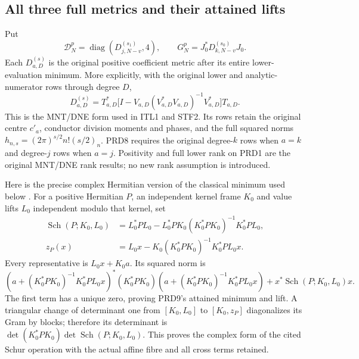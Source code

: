 \documentclass[11pt,a4paper]{article}
\begin{document}
\subsection{All three full metrics and their attained lifts}
Put
\[
 \mathcal D_N^p=\operatorname{diag}(D_{j,N-v}^{(s_1)},4),
 \qquad G_N^p=J_0^*D_{k,N-v}^{(s_0)}J_0.                  \tag{PRD7}
\]
Each $D_{a,D}^{(s)}$ is the original positive coefficient metric
after its entire lower-evaluation minimum. More explicitly, with
the original lower and analytic-numerator rows through degree $D$,
\[
 D_{a,D}^{(s)}=T_{a,D}^*
 \bigl[I-V_{a,D}(V_{a,D}^*V_{a,D})^{-1}V_{a,D}^*\bigr]T_{a,D}.
                                                               \tag{PRD8}
\]
This is the MNT/DNE form used in ITL1 and STF2. Its rows retain
the original centre $c'_a$, conductor division moments and phases,
and the full squared norms
$h_{n,s}=(2\pi)^{s/2}n!(s/2)_n$. PRD8 requires the original
degree-$k$ rows when $a=k$ and degree-$j$ rows when $a=j$.
Positivity and full lower rank on PRD1 are the original MNT/DNE
rank results; no new rank assumption is introduced.

Here is the precise complex Hermitian version of the classical
minimum used below \cite[Appendix A.5.5, p.~650]{human:boyd-vandenberghe}.
For a positive Hermitian $P$, an independent kernel frame $K_0$
and value lifts $L_0$ independent modulo that kernel, set
\[
 \begin{split}
 \operatorname{Sch}(P;K_0,L_0)
  &=L_0^*PL_0-L_0^*PK_0(K_0^*PK_0)^{-1}K_0^*PL_0,\\
 z_P(x)&=L_0x-K_0(K_0^*PK_0)^{-1}K_0^*PL_0x.
 \end{split}                                                     \tag{PRD9}
\]
Every representative is $L_0x+K_0a$. Its squared norm is
\[
 (a+(K_0^*PK_0)^{-1}K_0^*PL_0x)^*(K_0^*PK_0)
 (a+(K_0^*PK_0)^{-1}K_0^*PL_0x)
 +x^*\operatorname{Sch}(P;K_0,L_0)x.
\]
The first term has a unique zero, proving PRD9's attained minimum
and lift. A triangular change of determinant one from
$[K_0,L_0]$ to $[K_0,z_P]$ diagonalizes its Gram by blocks;
therefore its determinant is
$\det(K_0^*PK_0)\det\operatorname{Sch}(P;K_0,L_0)$.
This proves the complex form of the cited Schur operation with
the actual affine fibre and all cross terms retained.
\end{document}
